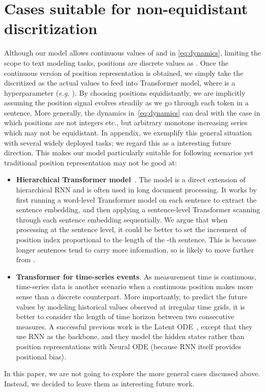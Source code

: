 \documentclass[11pt]{article}
\begin{document}
\section{Cases suitable for non-equidistant discritization}
Although our model allows continuous values of  and  in \eqref{eq:dynamics}, limiting the scope to text modeling tasks, positions are discrete values as . Once the continuous version of position representation  is obtained, we simply take the discritized  as the actual values to feed into Transformer model, where  is a hyperparameter (\emph{e.g.} ). By choosing positions  equidistantly, we are implicitly assuming the position signal evolves steadily as we go through each token in a sentence. More generally, the dynamics in~\eqref{eq:dynamics} can deal with the case in which positions are not integers  etc., but arbitrary monotone increasing series  which may not be equidistant. In appendix, we exemplify this general situation with several widely deployed tasks; we regard this as a interesting future direction.
This makes our model particularly suitable for following scenarios yet traditional position representation may not be good at:
\begin{itemize}[nosep,leftmargin=1em,labelwidth=*,align=left]
    \item \textbf{Hierarchical Transformer model}~\cite{liu2019hierarchical,zhang2019HIBERT}. The model is a direct extension of hierarchical RNN and is often used in long document processing. It works by first running a word-level Transformer model on each sentence to extract the sentence embedding, and then applying a sentence-level Transformer scanning through each sentence embedding sequentially. We argue that when processing at the sentence level, it could be better to set the increment of position index  proportional to the length of the -th sentence. This is because longer sentences tend to carry more information, so  is likely to move farther from .
    \item \textbf{Transformer for time-series events}. As measurement time is continuous, time-series data is another scenario when a continuous position makes more sense than a discrete counterpart. More importantly, to predict the future values by modeling historical values observed at irregular time grids, it is better to consider the length of time horizon between two consecutive measures. A successful previous work is the Latent ODE~\cite{NIPS2018_7892}, except that they use RNN as the backbone, and they model the hidden states rather than position representations with Neural ODE (because RNN itself provides positional bias).
\end{itemize}
In this paper, we are not going to explore the more general cases discussed above. Instead, we decided to leave them as interesting future work.
\end{document}
